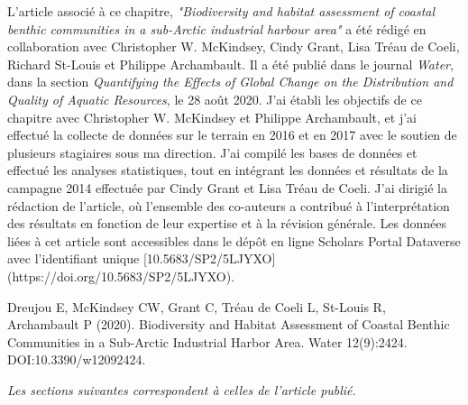 L'article associé à ce chapitre, \textit{"Biodiversity and habitat assessment of coastal benthic communities in a sub-Arctic industrial harbour area"} a été rédigé en collaboration avec Christopher W. McKindsey, Cindy Grant, Lisa Tréau de Coeli, Richard St-Louis et Philippe Archambault. Il a été publié dans le journal \textit{Water}, dans la section \textit{Quantifying the Effects of Global Change on the Distribution and Quality of Aquatic Resources}, le 28 août 2020. J'ai établi les objectifs de ce chapitre avec Christopher W. McKindsey et Philippe Archambault, et j'ai effectué la collecte de données sur le terrain en 2016 et en 2017 avec le soutien de plusieurs stagiaires sous ma direction. J'ai compilé les bases de données et effectué les analyses statistiques, tout en intégrant les données et résultats de la campagne 2014 effectuée par Cindy Grant et Lisa Tréau de Coeli. J'ai dirigié la rédaction de l'article, où l'ensemble des co-auteurs a contribué à l'interprétation des résultats en fonction de leur expertise et à la révision générale. Les données liées à cet article sont accessibles dans le dépôt en ligne Scholars Portal Dataverse avec l'identifiant unique [10.5683/SP2/5LJYXO](https://doi.org/10.5683/SP2/5LJYXO). \linebreak[4]


\begin{singlespace}
Dreujou E, McKindsey CW, Grant C, Tréau de Coeli L, St-Louis R, Archambault P (2020). Biodiversity and Habitat Assessment of Coastal Benthic Communities in a Sub-Arctic Industrial Harbor Area. Water 12(9):2424. DOI:10.3390/w12092424.
\end{singlespace}

\textit{Les sections suivantes correspondent à celles de l’article publié.}
